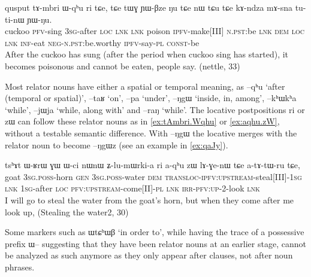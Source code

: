 \documentclass[oldfontcommands,oneside,a4paper,11pt]{article}
\newcommand{\ipa}[1]{{\phon \mbox{#1}}} %
\begin{document}
 \begin{exe}
\ex \label{ex:tAmbri.Wqhu} 
\gll 
\ipa{qusput}  	\ipa{tɤ-mbri}  	\ipa{ɯ-qʰu}  	\ipa{ri}  	\ipa{tɕe,}  	\ipa{tɕe}  	\ipa{tɯɣ}  	\ipa{ɲɯ-βze}  	\ipa{ŋu}  	\ipa{tɕe}  	\ipa{nɯ} \ipa{tɕu}  	\ipa{tɕe}  	\ipa{kɤ-ndza}  	\ipa{mɤ-sna}  	\ipa{tu-ti-nɯ}  	\ipa{ɲɯ-ŋu.}  \\
cuckoo \textsc{pfv}-sing \textsc{3sg}-after \textsc{loc} \textsc{lnk} \textsc{lnk} poison \textsc{ipfv}-make[III] \textsc{n.pst}:be \textsc{lnk}  \textsc{dem} \textsc{loc} \textsc{lnk} \textsc{inf}-eat \textsc{neg-n.pst}:be.worthy \textsc{ipfv}-say-\textsc{pl} \textsc{const}-be \\
\glt After the cuckoo has sung (after the period when cuckoo sing has started), it becomes poisonous and cannot be eaten, people say. (nettle, 33)
\end{exe}

Most relator nouns have either a spatial or temporal meaning, as \ipa{--qʰu} `after (temporal or spatial)',  \ipa{--taʁ} `on',  \ipa{--pa} `under',  \ipa{--ŋgɯ} `inside, in, among', \ipa{--kʰɯkʰa} `while', \ipa{--jɯja} `while, along with' and \ipa{--raŋ} `while'. The locative postpositions \ipa{ri} or \ipa{zɯ} can follow these relator nouns as in \ref{ex:tAmbri.Wqhu}  or \ref{ex:aqhu.zW}, without a testable semantic difference. With \ipa{--ŋgɯ} the  locative merges with the relator noun to  become \ipa{--ŋgɯz} (see an example in \ref{ex:qaJy}).

 \begin{exe}
\ex \label{ex:aqhu.zW} 
\gll
\ipa{tsʰɤt}  	\ipa{ɯ-ʁrɯ}  	\ipa{ɣɯ}  	\ipa{ɯ-ci}  	\ipa{nɯnɯ}  	\ipa{ʑ-lu-mɯrki-a}  	\ipa{ri}  	\ipa{a-qʰu}  	\ipa{zɯ}  	\ipa{lɤ-ɣe-nɯ}  	\ipa{tɕe}  \ipa{a-tɤ-tɯ-ru}  	\ipa{tɕe,}  \\
goat \textsc{3sg.poss}-horn \textsc{gen} \textsc{3sg.poss}-water \textsc{dem}  \textsc{transloc-ipfv:upstream}-steal[III]-\textsc{1sg} \textsc{lnk} \textsc{1sg}-after \textsc{loc} \textsc{pfv:upstream}-come[II]-\textsc{pl} \textsc{lnk} \textsc{irr-pfv:up}-2-look \textsc{lnk} \\
\glt I will go to steal the water from the goat's horn, but when they come after me look up, (Stealing the water2, 30)
\end{exe}

Some markers such as  \ipa{ɯtɕʰɯβ} `in order to', while having the trace of a possessive prefix \ipa{ɯ--} suggesting that they have been relator nouns at an earlier stage, cannot be analyzed as such anymore as they only appear after clauses, not after noun phrases.
\end{document}

